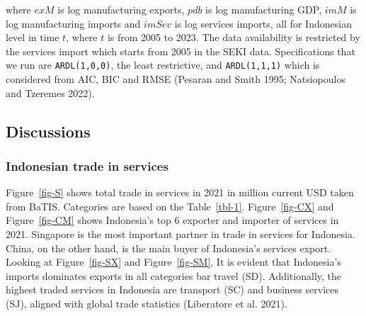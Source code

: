 \documentclass[
  letterpaper,
  DIV=11,
  numbers=noendperiod]{scrartcl}
\begin{document}
where \(exM\) is log manufacturing exports, \(pdb\) is log manufacturing
GDP, \(imM\) is log manufacturing imports and \(imSev\) is log services
imports, all for Indonesian level in time \(t\), where \(t\) is from
2005 to 2023. The data availability is restricted by the services import
which starts from 2005 in the SEKI data. Specifications that we run are
\texttt{ARDL(1,0,0)}, the least restrictive, and \texttt{ARDL(1,1,1)}
which is considered from AIC, BIC and RMSE (Pesaran and Smith 1995;
Natsiopoulos and Tzeremes 2022).

\subsection{Discussions}\label{discussions}

\subsubsection{Indonesian trade in
services}\label{indonesian-trade-in-services}

Figure~\ref{fig-S} shows total trade in services in 2021 in million
current USD taken from BaTIS. Categories are based on the
Table~\ref{tbl-1}. Figure~\ref{fig-CX} and Figure~\ref{fig-CM} shows
Indonesia's top 6 exporter and importer of services in 2021. Singapore
is the most important partner in trade in services for Indonesia. China,
on the other hand, is the main buyer of Indonesia's services export.
Looking at Figure~\ref{fig-SX} and Figure~\ref{fig-SM}, It is evident
that Indonesia's imports dominates exports in all categories bar travel
(SD). Additionally, the highest traded services in Indonesia are
transport (SC) and business services (SJ), aligned with global trade
statistics (Liberatore et al. 2021).
\end{document}
